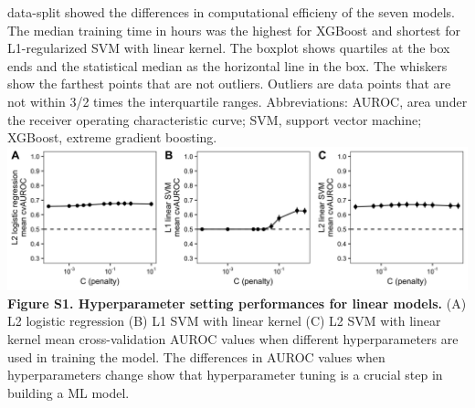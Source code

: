 \documentclass[11pt,]{article}
\begin{document}
data-split showed the differences in computational efficieny of the
seven models. The median training time in hours was the highest for
XGBoost and shortest for L1-regularized SVM with linear kernel. The
boxplot shows quartiles at the box ends and the statistical median as
the horizontal line in the box. The whiskers show the farthest points
that are not outliers. Outliers are data points that are not within 3/2
times the interquartile ranges. Abbreviations: AUROC, area under the
receiver operating characteristic curve; SVM, support vector machine;
XGBoost, extreme gradient boosting.\\
\newpage
\includegraphics{Figure_S1.png} \textbf{Figure S1. Hyperparameter
setting performances for linear models.} (A) L2 logistic regression (B)
L1 SVM with linear kernel (C) L2 SVM with linear kernel mean
cross-validation AUROC values when different hyperparameters are used in
training the model. The differences in AUROC values when hyperparameters
change show that hyperparameter tuning is a crucial step in building a
ML model.

\newpage
\end{document}
